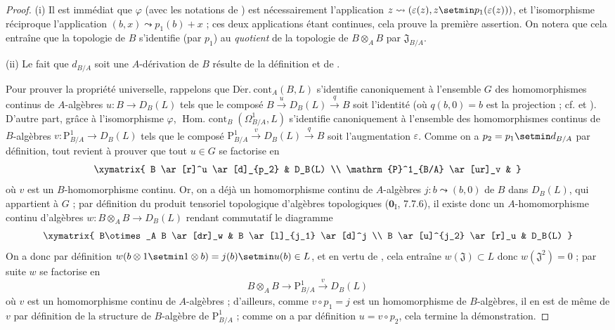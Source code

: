 \begin{proof}
(i) Il est immédiat que $\varphi$ (avec les notations de
) est nécessairement l'application
$z\leadsto(\varepsilon(z),z\setmin p_1(\varepsilon(z)))$, et l'isomorphisme
réciproque l'application $(b,x)\leadsto p_1(b)+x$ ; ces deux applications
étant continues, cela prouve la première assertion. On notera que cela
entraîne que la topologie de $B$ s'identifie (par $p_1$) au \emph{quotient}
de la topologie de $B\otimes_A B$ par $\mathfrak{J}_{B/A}$.

(ii) Le fait que $d_{B/A}$ soit une $A$-dérivation de $B$ résulte de la
définition  et de .

Pour prouver la propriété universelle, rappelons que
$\operatorname{D\acute{e}r.\ cont}_A(B,L)$ s'identifie canoniquement à
l'ensemble $G$ des homomorphismes continus de $A$-algèbres
$u:B\to D_B(L)$ tels que le composé
$B\xrightarrow{u}D_B(L)\xrightarrow{q}B$ soit l'identité (où $q(b,0)=b$ est
la projection ; cf.  et ). D'autre part,
grâce à l'isomorphisme $\varphi$,
$\operatorname{Hom.\ cont}_B(\Omega^1_{B/A},L)$ s'identifie canoniquement à
l'ensemble des homomorphismes continus de $B$-algèbres
$v:\mathrm{P}^1_{B/A}\to D_B(L)$ tels que le composé
$\mathrm{P}^1_{B/A}\xrightarrow{v}D_B(L)\xrightarrow{q}B$ soit
l'augmentation $\varepsilon$. Comme on a $p_2=p_1\setmin d_{B/A}$ par définition,
tout revient à prouver que tout $u\in G$ se factorise en
\[
\xymatrix{
  B \ar[r]^u \ar[d]_{p_2} & D_B(L) \\
  \mathrm{P}^1_{B/A} \ar[ur]_v &
}
\]
où $v$ est un $B$-homomorphisme continu. Or, on a déjà un homomorphisme
continu de $A$-algèbres $j:b\leadsto(b,0)$ de $B$ dans $D_B(L)$, qui
appartient à $G$ ; par définition du produit tensoriel topologique
d'algèbres topologiques ($\mathbf{0}_{\mathrm I}$, 7.7.6), il existe donc un
$A$-homomorphisme continu d'algèbres
$w:B\otimes_A B\to D_B(L)$ rendant commutatif le diagramme
\[
\xymatrix{
  B\otimes_A B \ar[dr]_w & B \ar[l]_{j_1} \ar[d]^j \\
  B \ar[u]^{j_2} \ar[r]_u & D_B(L)
}
\]
On a donc par définition
$w(b\otimes1\setmin 1\otimes b)=j(b)\setmin u(b)\in L$, et en vertu de
, cela entraîne $w(\mathfrak{J})\subset L$ donc
$w(\mathfrak{J}^2)=0$ ; par suite $w$ se factorise en
\[
  B\otimes_A B\to\mathrm{P}^1_{B/A}\xrightarrow{v}D_B(L)
\]
où $v$ est un homomorphisme continu de $A$-algèbres ; d'ailleurs, comme
$v\circ p_1=j$ est un homomorphisme de $B$-algèbres, il en est de même de
$v$ par définition de la structure de $B$-algèbre de
$\mathrm{P}^1_{B/A}$ ; comme on a par définition $u=v\circ p_2$, cela
termine la démonstration.
\end{proof}

